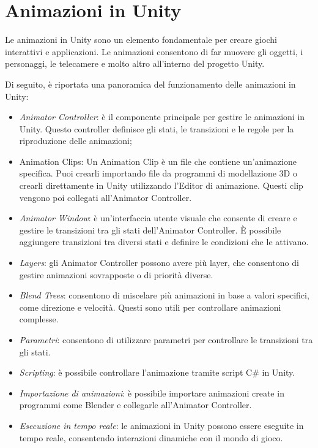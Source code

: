\section{Animazioni in Unity}

Le animazioni in Unity sono un elemento fondamentale per creare giochi interattivi e applicazioni. Le animazioni consentono di far muovere gli oggetti, i personaggi, le telecamere e molto altro all'interno del progetto Unity.

Di seguito, è riportata una panoramica del funzionamento delle animazioni in Unity:

\begin{itemize}
    \item \textit{Animator Controller}: è il componente principale per gestire le animazioni in Unity. Questo controller definisce gli stati, le transizioni e le regole per la riproduzione delle animazioni;
    \item Animation Clips: Un Animation Clip è un file che contiene un'animazione specifica. Puoi crearli importando file da programmi di modellazione 3D o crearli direttamente in Unity utilizzando l'Editor di animazione. Questi clip vengono poi collegati all'Animator Controller.
    \item \textit{Animator Window}: è un'interfaccia utente visuale che consente di creare e gestire le transizioni tra gli stati dell'Animator Controller. È possibile aggiungere transizioni tra diversi stati e definire le condizioni che le attivano.
    \item \textit{Layers}: gli Animator Controller possono avere più layer, che consentono di gestire animazioni sovrapposte o di priorità diverse.
    \item \textit{Blend Trees}: consentono di miscelare più animazioni in base a valori specifici, come direzione e velocità. Questi sono utili per controllare animazioni complesse.
    \item \textit{Parametri}: consentono di utilizzare parametri per controllare le transizioni tra gli stati.
    \item \textit{Scripting}: è possibile controllare l'animazione tramite script C\# in Unity.
    \item \textit{Importazione di animazioni}: è possibile importare animazioni create in programmi come Blender e collegarle all'Animator Controller.
    \item \textit{Esecuzione in tempo reale}: le animazioni in Unity possono essere eseguite in tempo reale, consentendo interazioni dinamiche con il mondo di gioco.
\end{itemize}

